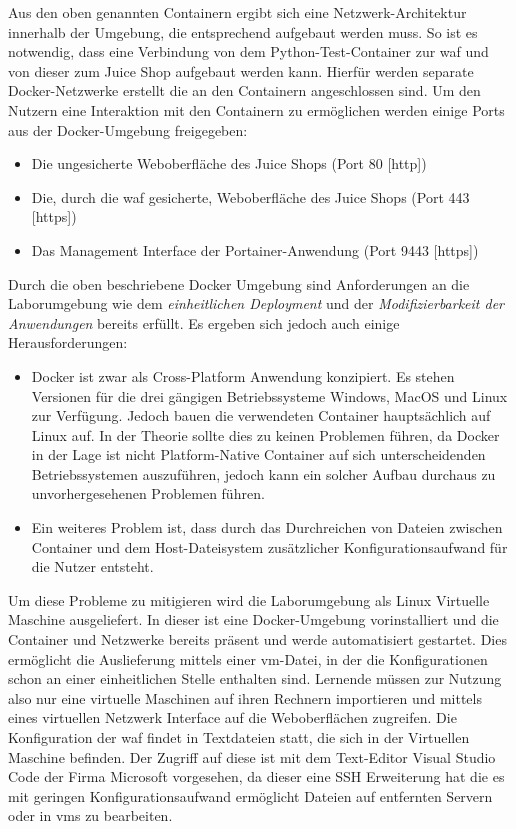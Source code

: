 Aus den oben genannten Containern ergibt sich eine Netzwerk-Architektur innerhalb der Umgebung, die entsprechend aufgebaut werden muss.
So ist es notwendig, dass eine Verbindung von dem Python-Test-Container zur \ac{waf} und von dieser zum Juice Shop aufgebaut werden kann.
Hierfür werden separate Docker-Netzwerke erstellt die an den Containern angeschlossen sind.
Um den Nutzern eine Interaktion mit den Containern zu ermöglichen werden einige Ports aus der Docker-Umgebung freigegeben:

\begin{itemize}
    \item Die ungesicherte Weboberfläche des Juice Shops (Port 80 [\ac{http}])
    \item Die, durch die \ac{waf} gesicherte, Weboberfläche des Juice Shops (Port 443 [\ac{https}])
    \item Das Management Interface der Portainer-Anwendung (Port 9443 [\ac{https}])
\end{itemize}

Durch die oben beschriebene Docker Umgebung sind Anforderungen an die Laborumgebung wie dem \textit{einheitlichen Deployment} und der \textit{Modifizierbarkeit der Anwendungen} bereits erfüllt.
Es ergeben sich jedoch auch einige Herausforderungen:

\begin{itemize}
    \item Docker ist zwar als Cross-Platform Anwendung konzipiert.
    Es stehen Versionen für die drei gängigen Betriebssysteme Windows, MacOS und Linux zur Verfügung.
    Jedoch bauen die verwendeten Container hauptsächlich auf Linux auf.
    In der Theorie sollte dies zu keinen Problemen führen, da Docker in der Lage ist nicht Platform-Native Container auf sich unterscheidenden Betriebssystemen auszuführen, jedoch kann ein solcher Aufbau durchaus zu unvorhergesehenen Problemen führen.
    \item Ein weiteres Problem ist, dass durch das Durchreichen von Dateien zwischen Container und dem Host-Dateisystem zusätzlicher Konfigurationsaufwand für die Nutzer entsteht.
\end{itemize}

Um diese Probleme zu mitigieren wird die Laborumgebung als Linux Virtuelle Maschine ausgeliefert.
In dieser ist eine Docker-Umgebung vorinstalliert und die Container und Netzwerke bereits präsent und werde automatisiert gestartet.
Dies ermöglicht die Auslieferung mittels einer \ac{vm}-Datei, in der die Konfigurationen schon an einer einheitlichen Stelle enthalten sind.
Lernende müssen zur Nutzung also nur eine virtuelle Maschinen auf ihren Rechnern importieren und mittels eines virtuellen Netzwerk Interface auf die Weboberflächen zugreifen.
Die Konfiguration der \ac{waf} findet in Textdateien statt, die sich in der Virtuellen Maschine befinden.
Der Zugriff auf diese ist mit dem Text-Editor Visual Studio Code der Firma Microsoft vorgesehen, da dieser eine SSH Erweiterung hat die es mit geringen Konfigurationsaufwand ermöglicht Dateien auf entfernten Servern oder in \acp{vm} zu bearbeiten.

